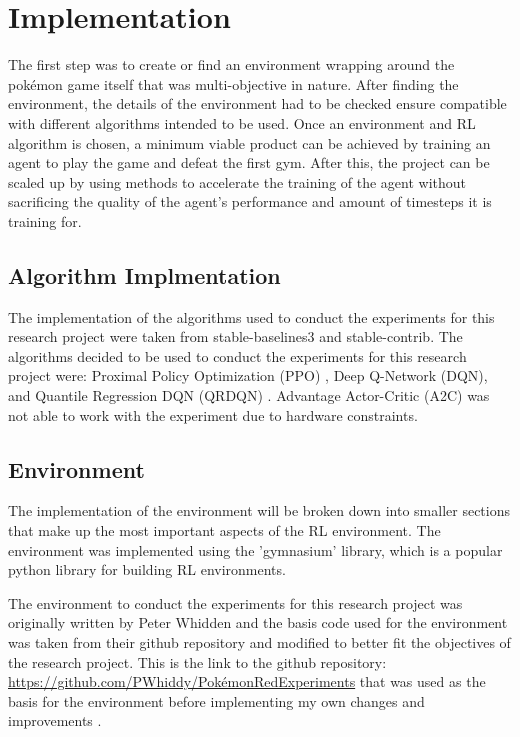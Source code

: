\section{Implementation}

The first step was to create or find an environment wrapping around the pokémon game itself that was multi-objective in nature. After finding the environment, the details of the environment had to be checked ensure compatible with different algorithms intended to be used. Once an environment and RL algorithm is chosen, a minimum viable product can be achieved by training an agent to play the game and defeat the first gym. After this,  the project can be scaled up by using methods to accelerate the training of the agent without sacrificing the quality of the agent's performance and amount of timesteps it is training for. 

\subsection{Algorithm Implmentation}

The implementation of the algorithms used to conduct the experiments for this research project were taken from stable-baselines3 and stable-contrib. The algorithms decided to be used to conduct the experiments for this research project were: Proximal Policy Optimization (PPO) , Deep Q-Network (DQN), and Quantile Regression DQN (QRDQN) \cite{stablebaselines3}. Advantage Actor-Critic (A2C) was not able to work with the experiment due to hardware constraints.

\subsection{Environment}

The implementation of the environment will be broken down into smaller sections that make up the most important aspects of the RL environment. The environment was implemented using the 'gymnasium' library, which is a popular python library for building RL environments.

The environment to conduct the experiments for this research project was originally written by Peter Whidden and the basis code used for the environment was taken from their github repository and modified to better fit the objectives of the research project. This is the link to the github repository: \url{https://github.com/PWhiddy/PokémonRedExperiments} that was used as the basis for the environment before implementing my own changes and improvements \cite{PWhiddy2023}.

